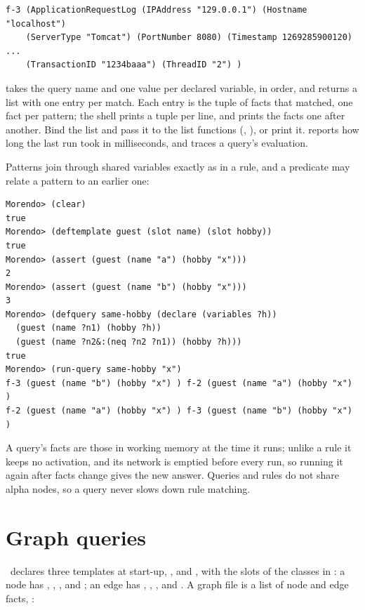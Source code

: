 \begin{lstlisting}[style=shell]
f-3 (ApplicationRequestLog (IPAddress "129.0.0.1") (Hostname "localhost")
    (ServerType "Tomcat") (PortNumber 8080) (Timestamp 1269285900120) ...
    (TransactionID "1234baaa") (ThreadID "2") )
\end{lstlisting}

 takes the query name and one value per declared variable,
in order, and returns a list with one entry per match. Each entry is the
tuple of facts that matched, one fact per pattern; the shell prints a
tuple per line, and  prints the facts one after another.
Bind the list and pass it to the list functions (,
), or print it.  reports how long the
last run took in milliseconds, and  traces a
query's evaluation.

Patterns join through shared variables exactly as in a rule, and a
predicate may relate a pattern to an earlier one:

\begin{lstlisting}[style=shell]
Morendo> (clear)
true
Morendo> (deftemplate guest (slot name) (slot hobby))
true
Morendo> (assert (guest (name "a") (hobby "x")))
2
Morendo> (assert (guest (name "b") (hobby "x")))
3
Morendo> (defquery same-hobby (declare (variables ?h))
  (guest (name ?n1) (hobby ?h))
  (guest (name ?n2&:(neq ?n2 ?n1)) (hobby ?h)))
true
Morendo> (run-query same-hobby "x")
f-3 (guest (name "b") (hobby "x") ) f-2 (guest (name "a") (hobby "x") )
f-2 (guest (name "a") (hobby "x") ) f-3 (guest (name "b") (hobby "x") )
\end{lstlisting}

A query's facts are those in working memory at the time it runs; unlike
a rule it keeps no activation, and its network is emptied before every
run, so running it again after facts change gives the new answer.
Queries and rules do not share alpha nodes, so a query never slows down
rule matching.

\section{Graph queries}

\Morendo\ declares three templates at start-up, ,  and
, with the slots of the classes in : a
node has , , ,  and
; an edge has , , , 
and . A graph file is a list of node and edge facts,
:

